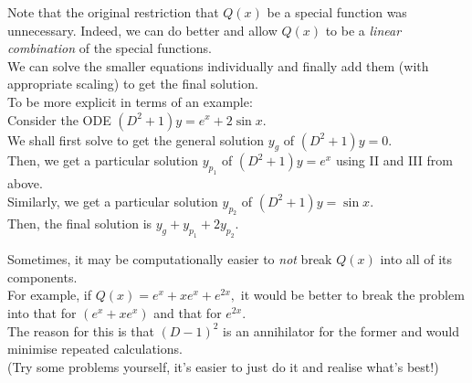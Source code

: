 \begin{mdframed}[style=boxstyle, frametitle={Slightly more general}]
	Note that the original restriction that $Q(x)$ be a special function was unnecessary. Indeed, we can do better and allow $Q(x)$ to be a \emph{linear combination} of the special functions.\\
	We can solve the smaller equations individually and finally add them (with appropriate scaling) to get the final solution.\\
	To be more explicit in terms of an example:\\
	Consider the ODE $(D^2 + 1)y = e^x + 2\sin x.$\\
	We shall first solve to get the general solution $y_g$ of $(D^2 + 1)y = 0.$\\
	Then, we get a particular solution $y_{p_1}$ of $(D^2 + 1)y = e^x$ using II and III from above.\\
	Similarly, we get a particular solution $y_{p_2}$ of $(D^2 + 1)y = \sin x.$\\ Then, the final solution is $y_g + y_{p_1} + 2y_{p_2}.$
\end{mdframed}
\begin{mdframed}[style=boxstyle2, frametitle={A note about calculations}]
	Sometimes, it may be computationally easier to \emph{not} break $Q(x)$ into all of its components.\\
	For example, if $Q(x) = e^x + xe^x + e^{2x},$ it would be better to break the problem into that for $(e^x + xe^x)$ and that for $e^{2x}.$\\
	The reason for this is that $(D - 1)^2$ is an annihilator for the former and would minimise repeated calculations.\\
	(Try some problems yourself, it's easier to just do it and realise what's best!)
\end{mdframed}